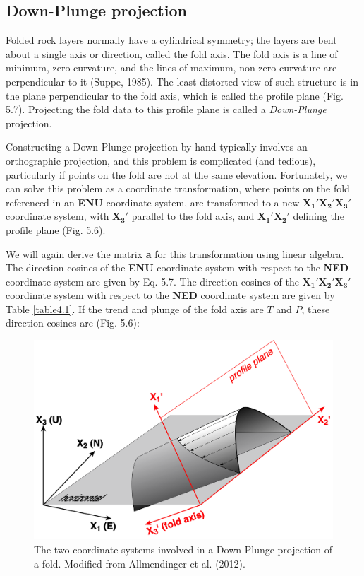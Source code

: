 \documentclass[a4paper , 12pt]{book}
\begin{document}
\subsection{Down-Plunge projection}

Folded rock layers normally have a cylindrical symmetry; the layers are bent about a single axis or direction, called the fold axis. The fold axis is a line of minimum, zero curvature, and the lines of maximum, non-zero curvature are perpendicular to it (Suppe, 1985). The least distorted view of such structure is in the plane perpendicular to the fold axis, which is called the profile plane (Fig. 5.7). Projecting the fold data to this profile plane is called a \textit{Down-Plunge} projection.

Constructing a Down-Plunge projection by hand typically involves an orthographic projection, and this problem is complicated (and tedious), particularly if points on the fold are not at the same elevation. Fortunately, we can solve this problem as a coordinate transformation, where points on the fold referenced in an \textbf{ENU} coordinate system, are transformed to a new $\mathbf{X_1\text{$'$}}\mathbf{X_2\text{$'$}}\mathbf{X_3\text{$'$}}$ coordinate system, with $\mathbf{X_3\text{$'$}}$ parallel to the fold axis, and $\mathbf{X_1\text{$'$}}\mathbf{X_2\text{$'$}}$ defining the profile plane (Fig. 5.6).

We will again derive the matrix \textbf{a} for this transformation using linear algebra. The direction cosines of the \textbf{ENU} coordinate system with respect to the \textbf{NED} coordinate system are given by Eq. 5.7. The direction cosines of the $\mathbf{X_1\text{$'$}}\mathbf{X_2\text{$'$}}\mathbf{X_3\text{$'$}}$ coordinate system with respect to the \textbf{NED} coordinate system are given by Table \ref{table4.1}. If the trend and plunge of the fold axis are $T$ and $P$, these direction cosines are (Fig. 5.6):

\begin{figure}[ht]
    \centering
    \includegraphics[width=12cm]{Figures/ch5f7.png}
    \caption{The two coordinate systems involved in a Down-Plunge projection of a fold. Modified from Allmendinger et al. (2012).}
\end{figure}
\end{document}
